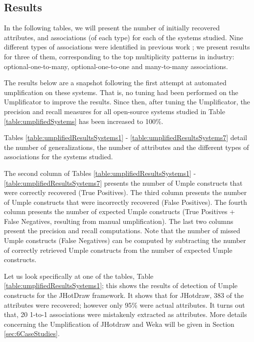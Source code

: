 \subsection{Results}

In the following tables, we will present the number of initially recovered  attributes, and associations (of each type) for each of the systems studied. Nine different types of associations were identified in previous work \cite{UmpleAssociations}; we present results for three of them, corresponding to the top multiplicity patterns in industry: optional-one-to-many, optional-one-to-one and many-to-many associations.

The results below are a snapshot following the first attempt at automated umplification on these systems. That is, no tuning had been performed on the Umplificator to improve the results. Since then, after tuning the Umplificator,  the precision and recall measures for all open-source systems studied in Table \ref{table:umplifiedSystems} has been increased to 100\%.

Tables \ref{table:umplifiedResultsSystems1} - \ref{table:umplifiedResultsSystems7} detail the number of generalizations, the number of attributes and the different types of associations for the systems studied.

The second column of Tables \ref{table:umplifiedResultsSystems1} - \ref{table:umplifiedResultsSystems7} presents the number of Umple constructs that were correctly recovered (True Positives). The third column presents the number of Umple constructs that were incorrectly recovered (False Positives). The fourth column presents the number of expected Umple constructs (True Positives + False Negatives, resulting from manual umplification). The last two columns present the precision and recall computations. Note that the number of missed Umple constructs (False Negatives) can be computed by subtracting the number of correctly retrieved Umple constructs from the number of expected Umple constructs. 


Let us look specifically at one of the tables, Table \ref{table:umplifiedResultsSystems1}; this shows the results of detection of Umple constructs for the JHotDraw framework.  It shows that for JHotdraw, 383 of the attributes were recovered; however only 95\% were actual attributes. It turns out that, 20 1-to-1 associations were mistakenly extracted as attributes. More details concerning the Umplification of JHotdraw and Weka will be given in Section \ref{sec:6CaseStudies}.

